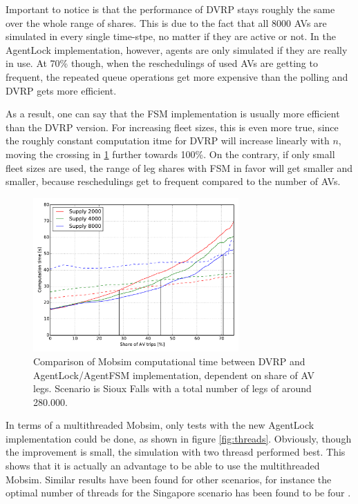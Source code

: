 Important to notice is that the performance of DVRP stays roughly the same over
the whole range of shares. This is due to the fact that all 8000 AVs are simulated
in every single time-stpe, no matter if they are active or not. In the AgentLock
implementation, however, agents are only simulated if they are really in use. At
70\% though, when the reschedulings of used AVs are getting to frequent, the repeated
queue operations get more expensive than the polling and DVRP gets more efficient.

As a result, one can say that the FSM implementation is usually more efficient than
the DVRP version. For increasing fleet sizes, this is even more true, since the
roughly constant computation itme for DVRP will increase linearly with $n$, moving
the crossing in \cref{fig:dvrpfsm} further towards 100\%. On the contrary, if only
small fleet sizes are used, the range of leg shares with FSM in favor will get
smaller and smaller, because reschedulings get to frequent compared to the number
of AVs.

\begin{figure}
    \centering
    \includegraphics[width=0.7\textwidth]{figures/dvrp_fsm.pdf}
    \caption{Comparison of Mobsim computational time between DVRP and AgentLock/AgentFSM implementation, dependent on share of AV legs. Scenario is Sioux Falls with
    a total number of legs of around 280.000.}
    \label{fig:dvrpfsm}
\end{figure}

In terms of a multithreaded Mobsim, only tests with the new AgentLock implementation
could be done, as shown in figure \cref{fig:threads}. Obviously, though the improvement
is small, the simulation with two threasd performed best. This shows that it is
actually an advantage to be able to use the multithreaded Mobsim. Similar results
have been found for other scenarios, for instance the optimal number of threads
for the Singapore scenario has been found to be four \citep{Erath2014}.

